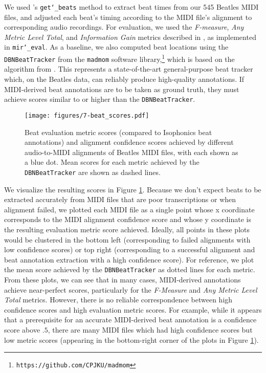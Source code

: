 We used \prettymidi{}'s \texttt{get\char`_beats} method to extract beat times from our 545 Beatles MIDI files, and adjusted each beat's timing according to the MIDI file's alignment to corresponding audio recordings.
For evaluation, we used the {\em F-measure}, {\em Any Metric Level Total}, and {\em Information Gain} metrics described in \cite{davies2009evaluation}, as implemented in \texttt{mir\char`_eval}.
As a baseline, we also computed beat locations using the \texttt{DBNBeatTracker} from the \texttt{madmom} software library,\footnote{\texttt{https://github.com/CPJKU/madmom}} which is based on the algorithm from \cite{bock2014multi}.
This represents a state-of-the-art general-purpose beat tracker which, on the Beatles data, can reliably produce high-quality annotations.
If MIDI-derived beat annotations are to be taken as ground truth, they must achieve scores similar to or higher than the \texttt{DBNBeatTracker}.

\begin{figure}
    \centering
    \texttt{[image: figures/7-beat\_scores.pdf]}
    \caption[Beat evaluation and alignment confidence scores]{Beat evaluation metric scores (compared to Isophonics beat annotations) and alignment confidence scores achieved by different audio-to-MIDI alignments of Beatles MIDI files, with each shown as a blue dot.
Mean scores for each metric achieved by the \texttt{DBNBeatTracker} \cite{bock2014multi} are shown as dashed lines.}
    \label{fig:beat}
\end{figure}

We visualize the resulting scores in Figure \ref{fig:beat}.
Because we don't expect beats to be extracted accurately from MIDI files that are poor transcriptions or when alignment failed, we plotted each MIDI file as a single point whose x coordinate corresponds to the MIDI alignment confidence score and whose y coordinate is the resulting evaluation metric score achieved.
Ideally, all points in these plots would be clustered in the bottom left (corresponding to failed alignments with low confidence scores) or top right (corresponding to a successful alignment and beat annotation extraction with a high confidence score).
For reference, we plot the mean score achieved by the \texttt{DBNBeatTracker} as dotted lines for each metric.
From these plots, we can see that in many cases, MIDI-derived annotations achieve near-perfect scores, particularly for the {\em F-Measure} and {\em Any Metric Level Total} metrics.
However, there is no reliable correspondence between high confidence scores and high evaluation metric scores.
For example, while it appears that a prerequisite for an accurate MIDI-derived beat annotation is a confidence score above $.5$, there are many MIDI files which had high confidence scores but low metric scores (appearing in the bottom-right corner of the plots in Figure \ref{fig:beat}).

